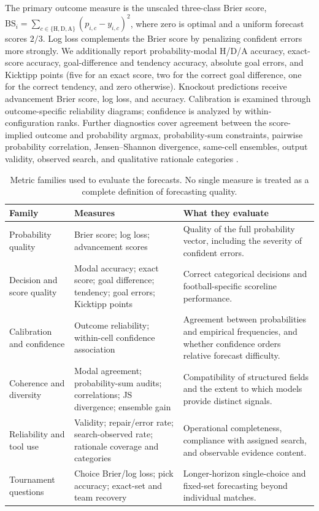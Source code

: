 The primary outcome measure is the unscaled three-class Brier score,
$\mathrm{BS}_i=\sum_{c\in\{\mathrm{H,D,A}\}}(p_{i,c}-y_{i,c})^2$, where zero is optimal and a
uniform forecast scores $2/3$. Log loss complements the Brier score by penalizing confident errors
more strongly. We additionally report probability-modal H/D/A accuracy, exact-score accuracy,
goal-difference and tendency accuracy, absolute goal errors, and Kicktipp points (five for an exact
score, two for the correct goal difference, one for the correct tendency, and zero otherwise).
Knockout predictions receive advancement Brier score, log loss, and accuracy. Calibration is examined
through outcome-specific reliability diagrams; confidence is analyzed by within-configuration ranks.
Further diagnostics cover agreement between the score-implied outcome and probability argmax,
probability-sum constraints, pairwise probability correlation, Jensen--Shannon divergence,
same-cell ensembles, output validity, observed search, and qualitative rationale categories
\citep{brier_1950,gneiting_raftery_2007}.

\begin{table}[t]
  \caption{Metric families used to evaluate the forecasts. No single measure is treated as a complete
  definition of forecasting quality.}
  \label{tab:evaluation-metrics}
  \centering
  \scriptsize
  \begin{tabularx}{\textwidth}{>{\raggedright\arraybackslash}p{}
    >{\raggedright\arraybackslash}p{}X}
    \toprule
    \textbf{Family} & \textbf{Measures} & \textbf{What they evaluate} \\
    \midrule
    Probability quality & Brier score; log loss; advancement scores &
    Quality of the full probability vector, including the severity of confident errors. \\
    Decision and score quality & Modal accuracy; exact score; goal difference; tendency; goal errors; Kicktipp points &
    Correct categorical decisions and football-specific scoreline performance. \\
    Calibration and confidence & Outcome reliability; within-cell confidence association &
    Agreement between probabilities and empirical frequencies, and whether confidence orders
    relative forecast difficulty. \\
    Coherence and diversity & Modal agreement; probability-sum audits; correlations; JS divergence; ensemble gain &
    Compatibility of structured fields and the extent to which models provide distinct signals. \\
    Reliability and tool use & Validity; repair/error rate; search-observed rate; rationale coverage and categories &
    Operational completeness, compliance with assigned search, and observable evidence content. \\
    Tournament questions & Choice Brier/log loss; pick accuracy; exact-set and team recovery &
    Longer-horizon single-choice and fixed-set forecasting beyond individual matches. \\
    \bottomrule
  \end{tabularx}
\end{table}


